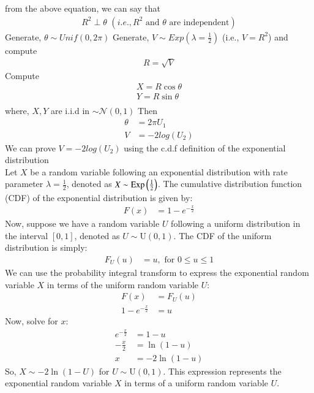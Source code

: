 \documentclass[article]{IEEEtran}
\theoremstyle{remark}
\begin{document}
  from the above equation, we can say that 
  \begin{align}
        R^2\perp\theta \,\, (i.e., R^2 \text{ and } \theta \text{ are independent})
  \end{align}
  Generate, $\theta \sim Unif(0,2\pi)$ 
  Generate, $V \sim Exp(\lambda = \frac{1}{2})$ (i.e., $V = R^2$) and compute 
  \begin{align}
        R=\sqrt{V}
  \end{align}
  Compute 
  \begin{align}
        X = R\cos\theta\\
        Y = R\sin\theta\\
  \end{align}
  where, $X,Y$ are i.i.d in $\sim \mathcal{N}(0,1)$
  Then  
  \begin{align}
        \theta &= 2\pi U_1\\
        V &= -2log(U_2)
  \end{align}
  We can prove $V = -2log(U_2)$ using the c.d.f definition of the exponential distribution\\
  Let $X$ be a random variable following an exponential distribution with rate parameter $\lambda = \frac{1}{2}$, denoted as $X \sim \text{Exp}\left(\frac{1}{2}\right)$. The cumulative distribution function (CDF) of the exponential distribution is given by:
\begin{align}
F(x) &= 1 - e^{-\frac{x}{2}}
\end{align}
Now, suppose we have a random variable $U$ following a uniform distribution in the interval $[0, 1]$, denoted as $U \sim \text{U}(0, 1)$. The CDF of the uniform distribution is simply:
\begin{align}
F_U(u) &= u, \text{ for } 0 \leq u \leq 1
\end{align}
We can use the probability integral transform to express the exponential random variable $X$ in terms of the uniform random variable $U$:
\begin{align}
F(x) &= F_U(u) \\
1 - e^{-\frac{x}{2}} &= u
\end{align}
Now, solve for $x$:
\begin{align}
e^{-\frac{x}{2}} &= 1 - u \\
-\frac{x}{2} &= \ln(1 - u) \\
x &= -2 \ln(1 - u)
\end{align}
So, $X \sim -2 \ln(1 - U)$ for $U \sim \text{U}(0, 1)$. This expression represents the exponential random variable $X$ in terms of a uniform random variable $U$.\\
\end{document}
